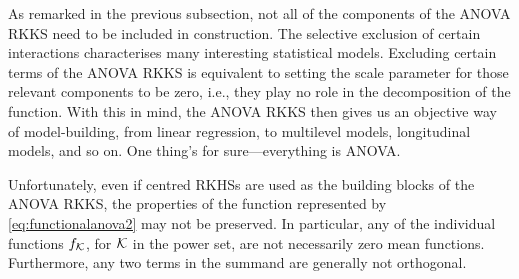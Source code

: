 As remarked in the previous subsection, not all of the components of the ANOVA RKKS need to be included in construction.
The selective exclusion of certain interactions characterises many interesting statistical models.
Excluding certain terms of the ANOVA RKKS is equivalent to setting the scale parameter for those relevant components to be zero, i.e., they play no role in the decomposition of the function.
With this in mind, the ANOVA RKKS then gives us an objective way of model-building, from linear regression, to multilevel models, longitudinal models, and so on.
One thing's for sure---everything is ANOVA.

\begin{remark}
  Unfortunately, even if centred RKHSs are used as the building blocks of the ANOVA RKKS, the properties of the function represented by \eqref{eq:functionalanova2} may not be preserved.
  In particular, any of the individual functions $f_{\mathcal K}$, for ${\mathcal K}$ in the power set, are not necessarily zero mean functions.
  Furthermore, any two terms in the summand are generally not orthogonal.
\end{remark}

